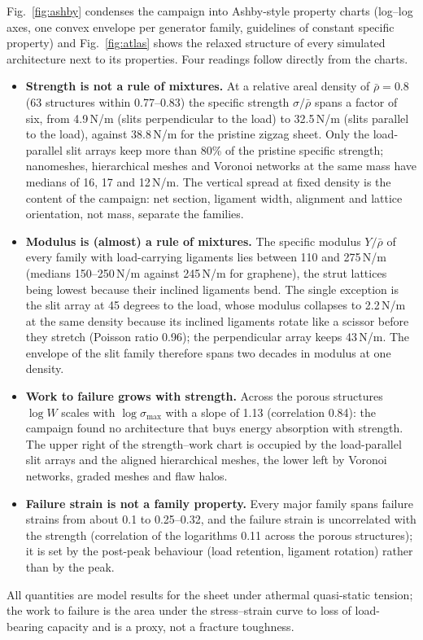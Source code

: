Fig.~\ref{fig:ashby} condenses the campaign into Ashby-style property charts (log--log axes, one convex envelope per generator family, guidelines of constant specific property) and Fig.~\ref{fig:atlas} shows the relaxed structure of every simulated architecture next to its properties. Four readings follow directly from the charts.
\begin{itemize}
\item \textbf{Strength is not a rule of mixtures.} At a relative areal density of $\bar\rho = 0.8$ (63 structures within 0.77--0.83) the specific strength $\sigma/\bar\rho$ spans a factor of six, from 4.9\,N/m (slits perpendicular to the load) to 32.5\,N/m (slits parallel to the load), against 38.8\,N/m for the pristine zigzag sheet. Only the load-parallel slit arrays keep more than 80\% of the pristine specific strength; nanomeshes, hierarchical meshes and Voronoi networks at the same mass have medians of 16, 17 and 12\,N/m. The vertical spread at fixed density is the content of the campaign: net section, ligament width, alignment and lattice orientation, not mass, separate the families.
\item \textbf{Modulus is (almost) a rule of mixtures.} The specific modulus $Y/\bar\rho$ of every family with load-carrying ligaments lies between 110 and 275\,N/m (medians 150--250\,N/m against 245\,N/m for graphene), the strut lattices being lowest because their inclined ligaments bend. The single exception is the slit array at 45 degrees to the load, whose modulus collapses to 2.2\,N/m at the same density because its inclined ligaments rotate like a scissor before they stretch (Poisson ratio 0.96); the perpendicular array keeps 43\,N/m. The envelope of the slit family therefore spans two decades in modulus at one density.
\item \textbf{Work to failure grows with strength.} Across the porous structures $\log W$ scales with $\log\sigma_\mathrm{max}$ with a slope of 1.13 (correlation 0.84): the campaign found no architecture that buys energy absorption with strength. The upper right of the strength--work chart is occupied by the load-parallel slit arrays and the aligned hierarchical meshes, the lower left by Voronoi networks, graded meshes and flaw halos.
\item \textbf{Failure strain is not a family property.} Every major family spans failure strains from about 0.1 to 0.25--0.32, and the failure strain is uncorrelated with the strength (correlation of the logarithms 0.11 across the porous structures); it is set by the post-peak behaviour (load retention, ligament rotation) rather than by the peak.
\end{itemize}
All quantities are model results for the \rebo{} sheet under athermal quasi-static tension; the work to failure is the area under the stress--strain curve to loss of load-bearing capacity and is a proxy, not a fracture toughness.
